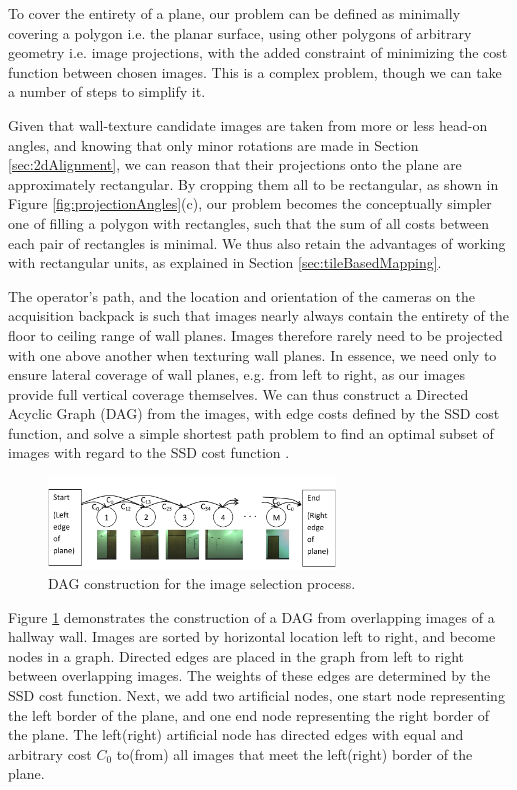 \documentclass[]{spie}  %
\begin{document}
To cover the entirety of a plane, our problem can be defined as
minimally covering a polygon i.e. the planar surface, using other
polygons of arbitrary geometry i.e. image projections, with the added
constraint of minimizing the cost function between chosen images.
This is a complex problem, though we can take a number of steps to
simplify it.

Given that wall-texture candidate images are taken from more or less
head-on angles, and knowing that only minor rotations are made in
Section \ref{sec:2dAlignment}, we can reason that their projections
onto the plane are approximately rectangular. By cropping them all to
be rectangular, as shown in Figure \ref{fig:projectionAngles}(c), our
problem becomes the conceptually simpler one of filling a polygon with
rectangles, such that the sum of all costs between each pair of
rectangles is minimal. We thus also retain the advantages of working
with rectangular units, as explained in Section
\ref{sec:tileBasedMapping}.

The operator's path, and the location and orientation of the cameras
on the acquisition backpack is such that images nearly always contain
the entirety of the floor to ceiling range of wall planes. Images
therefore rarely need to be projected with one above another when
texturing wall planes. In essence, we need only to ensure lateral
coverage of wall planes, e.g. from left to right, as our images
provide full vertical coverage themselves. We can thus construct a
Directed Acyclic Graph (DAG) from the images, with edge costs defined
by the SSD cost function, and solve a simple shortest path problem to
find an optimal subset of images with regard to the SSD cost function
\cite{dijkstra}.

\begin{figure}
  \centering
  \includegraphics[width=3in]{dagCreation.pdf}
  \caption{DAG construction for the image selection process. \\}
  \label{fig:dagCreation}
\end{figure}

Figure \ref{fig:dagCreation} demonstrates the construction of a DAG
from overlapping images of a hallway wall. Images are sorted by
horizontal location left to right, and become nodes in a
graph. Directed edges are placed in the graph from left to right
between overlapping images. The weights of these edges are determined
by the SSD cost function. Next, we add two artificial nodes, one start
node representing the left border of the plane, and one end node
representing the right border of the plane. The left(right) artificial
node has directed edges with equal and arbitrary cost $C_0$ to(from)
all images that meet the left(right) border of the plane.
\end{document}
